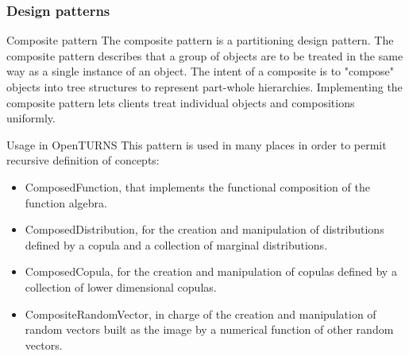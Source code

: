 \documentclass[8pt]{beamer}
\begin{document}
\begin{frame}
  \frametitle{Design patterns}
  \begin{block}{Composite pattern}
    The \alert{composite pattern} is a partitioning design pattern. The composite pattern describes that a group of objects are to be treated in the same way as a single instance of an object. The intent of a composite is to "compose" objects into tree structures to represent part-whole hierarchies. Implementing the composite pattern lets clients treat individual objects and compositions uniformly.
  \end{block}
  \begin{block}{Usage in OpenTURNS}
    This pattern is used in many places in order to permit recursive definition of concepts:
    \begin{itemize}
    \item \alert{ComposedFunction}, that implements the functional composition of the function algebra.
    \item \alert{ComposedDistribution}, for the creation and manipulation of distributions defined by a copula and a collection of marginal distributions.
    \item \alert{ComposedCopula}, for the creation and manipulation of copulas defined by a collection of lower dimensional copulas.
    \item \alert{CompositeRandomVector}, in charge of the creation and manipulation of random vectors built as the image by a numerical function of other random vectors.
    \end{itemize}
  \end{block}
\end{frame}
\end{document}

